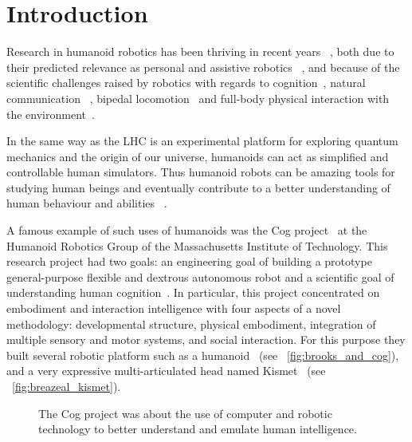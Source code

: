


\chapter{Introduction} %


Research in humanoid robotics has been thriving in recent years~\cite{hirai1998development} \cite{kaneko2008humanoid}, both due to their predicted relevance as personal and assistive robotics~\cite{tapus2007socially} \cite{oztop2005human}, and because of the scientific challenges raised by robotics with regards to cognition~\cite{asada2001cognitive}, natural communication~\cite{stiefelhagen2004natural} \cite{breazeal2002robots}, bipedal locomotion~\cite{yamaguchi1999development} \cite{chestnutt2005footstep} \cite{collins2005bipedal} and full-body physical interaction with the environment~\cite{ude2004programming}.

In the same way as the LHC is an experimental platform for exploring quantum mechanics and the origin of our universe, humanoids can act as simplified and controllable human simulators. Thus humanoid robots can be amazing tools for studying human beings and eventually contribute to a better understanding of human behaviour and abilities~\cite{atkeson2000using} \cite{cheng2007cb} \cite{brooks1986achieving}.

A famous example of such uses of humanoids was the Cog project~\cite{brooks1999cog} at the Humanoid Robotics Group of the Massachusetts Institute of Technology. This research project had two goals: an engineering goal of building a prototype general-purpose flexible and dextrous autonomous robot and a scientific goal of understanding human cognition~\cite{brooks1994building}. In particular, this project concentrated on embodiment and interaction intelligence with four aspects of a novel methodology: developmental structure, physical embodiment, integration of multiple sensory and motor systems, and social interaction. For this purpose they built several robotic platform such as a humanoid~\cite{brooks1999cog} (see \figurename~\ref{fig:brooks_and_cog}), and a very expressive multi-articulated head named Kismet~\cite{breazeal2003emotion} (see \figurename~\ref{fig:breazeal_kismet}).



\begin{figure}[t]
\centering
    \hfil
    \caption{The Cog project was about the use of computer and robotic technology to better understand and emulate human intelligence.}
    \label{fig:cog_project}
\end{figure}


